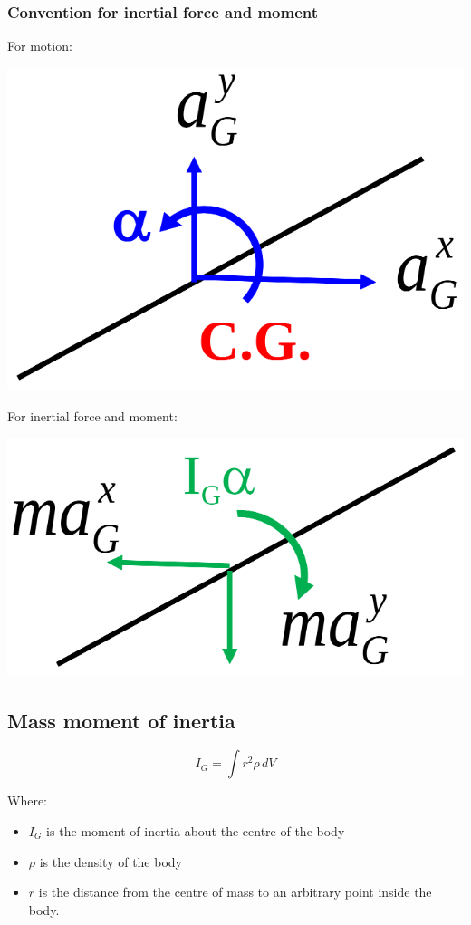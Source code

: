 \documentclass[11pt]{article}
\begin{document}
\subsubsection{Convention for inertial force and moment}
\label{sec:orge090413}
For motion:
\begin{center}
\includegraphics[width=.9\linewidth]{./images/d-alemberts-principle-convention-for-motion-diagram.png}
\end{center}

For inertial force and moment:
\begin{center}
\includegraphics[width=.9\linewidth]{./images/d-alemberts-principle-convention-for-inertial-force-and-moment-diagram.png}
\end{center}

 \newpage
\subsection{Mass moment of inertia}
\label{sec:orga1431ee}
\[I_G = \int r^2 \rho \, dV\]

Where:
\begin{itemize}
\item \(I_G\) is the moment of inertia about the centre of the body
\item \(\rho\) is the density of the body
\item \(r\) is the distance from the centre of mass to an arbitrary point inside the body.
\end{itemize}
\end{document}
